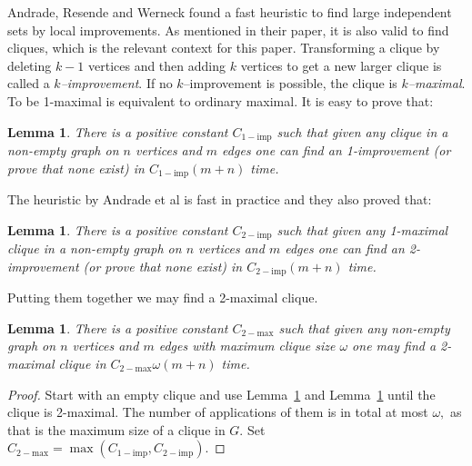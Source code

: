 \documentclass{article}
\theoremstyle{plain}
\newtheorem{lem}[thm]{Lemma}
\theoremstyle{definition}
\begin{document}
Andrade, Resende and Werneck  \cite{arw12}  found a fast heuristic to find large independent sets by local improvements. As mentioned in their paper, it is also valid to find cliques, which is the relevant context for this paper. Transforming a clique by deleting $k-1$ vertices and then adding $k$ vertices to get a new larger clique is called a \emph{$k$--improvement}. If no $k$--improvement is possible, the clique is \emph{$k$--maximal}. To be 1-maximal is equivalent to ordinary maximal. It is easy to prove that:
\begin{lem}\label{1-imp}
There is a positive constant $C_{\mathrm{1-imp}}$ such that given any clique in a non-empty graph on $n$ vertices and $m$ edges one can find an 1-improvement (or prove that none exist) in $C_{\mathrm{1-imp}}(m+n)$ time.
\end{lem}
The heuristic by Andrade et al is fast in practice and they also proved that:
\begin{lem}\label{2-imp}
There is a positive constant $C_{\mathrm{2-imp}}$ such that given any 1-maximal clique in a non-empty graph on $n$ vertices and $m$ edges one can find an 2-improvement (or prove that none exist) in $C_{\mathrm{2-imp}}(m+n)$ time.
\end{lem}
Putting them together we may find a 2-maximal clique.
\begin{lem}\label{comp1}
There is a positive constant $C_{\mathrm{2-max}}$ such that given any non-empty graph on $n$ vertices and $m$ edges with maximum clique size $\omega$ one may find a 2-maximal clique in 
$C_{\mathrm{2-max}}\omega(m+n)$ time.
\end{lem}
\begin{proof}
Start with an empty clique and use Lemma~\ref{1-imp} and  Lemma~\ref{2-imp} until the clique is 2-maximal. The number of applications of them is in total at most $\omega,$ as that is the maximum size of a clique in $G.$ Set $C_{\mathrm{2-max}} = \max(C_{\mathrm{1-imp}} ,C_{\mathrm{2-imp}}).$
\end{proof}
\end{document}
